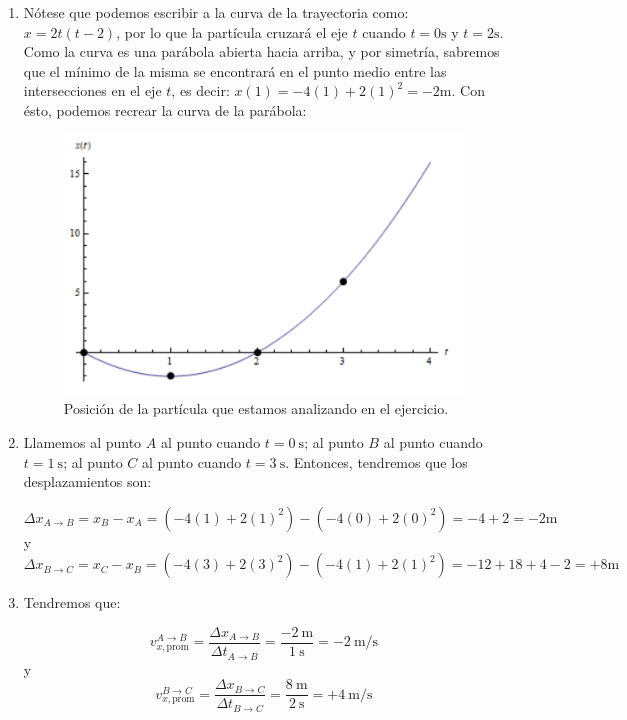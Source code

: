 \begin{solution*}
\begin{enumerate}[label=\alph*)]
    \item N\'otese que podemos escribir a la curva de la trayectoria como: $x=2t(t-2)$, por lo que la part\'icula cruzar\'a el eje $t$ cuando $t=0\si{\second}$ y  $t=2\si{\second}$. Como la curva es una par\'abola abierta hacia arriba, y por simetr\'ia, sabremos que el m\'inimo de la misma se encontrar\'a en el punto medio entre las intersecciones en el eje $t$, es decir: $x(1)=-4(1)+2(1)^2=-2\si{\meter}$. Con \'esto, podemos recrear la curva de la par\'abola:

\begin{figure}[ht]
\centering
  \includegraphics[width=\textwidth]{lecture2/plotparab.PNG}
\caption{Posici\'on de la part\'icula que estamos analizando en el ejercicio.}
\label{fig:plotparab2}
\end{figure}    

    \item Llamemos al punto $A$ al punto cuando $t=\SI{0}{\second}$; al punto $B$ al punto cuando $t=\SI{1}{\second}$; al punto $C$ al punto cuando $t=\SI{3}{\second}$. Entonces, tendremos que los desplazamientos son:
    
    \[ \Delta x_{A\to B} = x_{B} - x_{A} = (-4(1)+2(1)^2) - (-4(0)+2(0)^2) = -4+2=-2\si{\meter} \]
    y
    \[ \Delta x_{B\to C} = x_{C} - x_{B} = (-4(3)+2(3)^2) - (-4(1)+2(1)^2) = -12+18+4-2=+8\si{\meter} \]
    
    \item Tendremos que:
    
    \[ v_{x, \text{prom}}^{A\to B} = \frac{\Delta x_{A\to B}}{\Delta t_{A\to B}} = \frac{\SI{-2}{\meter}}{\SI{1}{\second}}=\SI{-2}{\meter/\second} \]
    y
    \[ v_{x, \text{prom}}^{B\to C} = \frac{\Delta x_{B\to C}}{\Delta t_{B\to C}} = \frac{\SI{8}{\meter}}{\SI{2}{\second}}=+\SI{4}{\meter/\second} \]
    

\end{enumerate}
\end{solution*}
